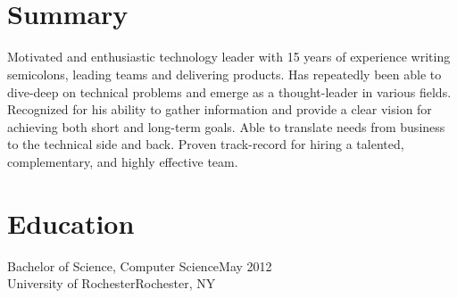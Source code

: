\documentclass[oneside, final]{scrartcl}
\begin{document}
\begin{center}
 
\textsc{\LARGE{}}\\
\\

\section{Summary}
\begin{flushleft}

Motivated and enthusiastic technology leader with 15 years of experience writing semicolons, leading teams and delivering products. Has repeatedly been able to dive-deep on technical problems and emerge as a thought-leader in various fields. Recognized for his ability to gather information and provide a clear vision for achieving both short and long-term goals. Able to translate needs from business to the technical side and back. Proven track-record for hiring a talented, complementary, and highly effective team.
\end{flushleft}


\section{Education}
Bachelor of Science, Computer Science\hfill May 2012\\
University of Rochester\hfill Rochester, NY\\


\end{center}
\end{document}
